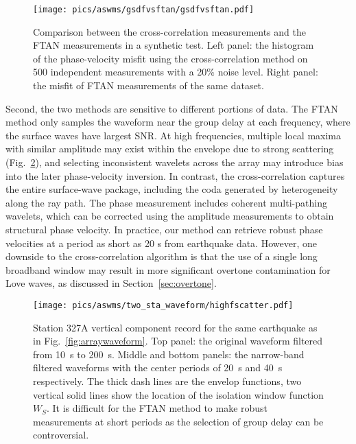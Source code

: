 \begin{figure}
	\center
	\texttt{[image: pics/aswms/gsdfvsftan/gsdfvsftan.pdf]}
	\caption[Comparison between the cross-correlation measurements and the FTAN measurements in a synthetic test.]{Comparison between the cross-correlation measurements and the FTAN measurements in a synthetic test. Left panel: the histogram of the phase-velocity misfit using the cross-correlation method on 500 independent measurements with a 20\% noise level. Right panel: the misfit of FTAN measurements of the same dataset.}
	\label{fig:syntest}
\end{figure}


Second, the two methods are sensitive to different portions of data. The FTAN method only samples the waveform near the group delay at each frequency, where the surface waves have largest SNR. At high frequencies, multiple local maxima with similar amplitude may exist within the envelope due to strong scattering (Fig.~\ref{fig:highfscatter}), and selecting inconsistent wavelets across the array may introduce bias into the later phase-velocity inversion. In contrast, the cross-correlation captures the entire surface-wave package, including the coda generated by heterogeneity along the ray path. The phase measurement includes coherent multi-pathing wavelets, which can be corrected using the amplitude measurements to obtain structural phase velocity. In practice, our method can retrieve robust phase velocities at a period as short as 20 s from earthquake data. However, one downside to the cross-correlation algorithm is that the use of a single long broadband window may result in more significant overtone contamination for Love waves, as discussed in Section~\ref{sec:overtone}. 

\begin{figure}
	\center
	\texttt{[image: pics/aswms/two\_sta\_waveform/highfscatter.pdf]}
	\caption[Station 327A vertical component record.]{Station 327A vertical component record for the same earthquake as in Fig.~\ref{fig:arraywaveform}. Top panel: the original waveform filtered from 10~s to 200~s. Middle and bottom panels: the narrow-band filtered waveforms with the center periods of 20~s and 40~s respectively. The thick dash lines are the envelop functions, two vertical solid lines show the location of the isolation window function $W_S$. It is difficult for the FTAN method to make robust measurements at short periods as the selection of group delay can be controversial.}
	\label{fig:highfscatter}
\end{figure}

